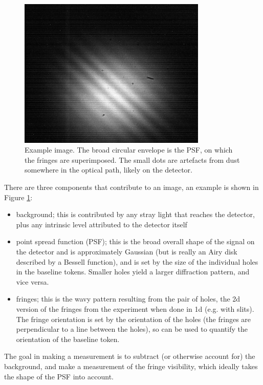 \documentclass[11pt]{article}
\begin{document}
\begin{figure}[h]
    \centering
    \includegraphics[width=0.8\textwidth]{doc/det-img.png}
    \caption{Example image. The broad circular envelope is the PSF, on which the fringes are superimposed. The small dots are artefacts from dust somewhere in the optical path, likely on the detector.}
    \label{fig:det-img}
\end{figure}

There are three components that contribute to an image, an example is shown in Figure \ref{fig:det-img}:
\begin{itemize}
    \item background; this is contributed by any stray light that reaches the detector, plus any intrinsic level attributed to the detector itself
    \item point spread function (PSF); this is the broad overall shape of the signal on the detector and is approximately Gaussian (but is really an Airy disk described by a Bessell function), and is set by the size of the individual holes in the baseline tokens. Smaller holes yield a larger diffraction pattern, and vice versa.
    \item fringes; this is the wavy pattern resulting from the pair of holes, the 2d version of the fringes from the experiment when done in 1d (e.g. with slits). The fringe orientation is set by the orientation of the holes (the fringes are perpendicular to a line between the holes), so can be used to quantify the orientation of the baseline token.
\end{itemize}
The goal in making a measurement is to subtract (or otherwise account for) the background, and make a measurement of the fringe visibility, which ideally takes the shape of the PSF into account.
\end{document}
